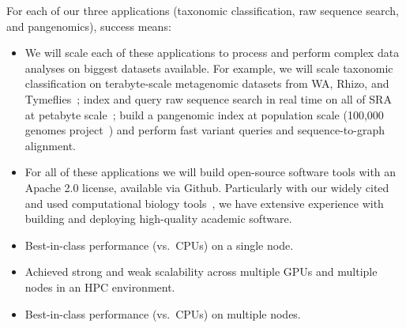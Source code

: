 For each of our three applications (taxonomic classification, raw sequence search, and pangenomics), success means:

\begin{itemize}[noitemsep]
  \item We will scale each of these applications to process and perform complex data analyses on biggest datasets available. For example, we will scale taxonomic classification on terabyte-scale metagenomic datasets from WA, Rhizo, and Tymeflies~\cite{hofmeyr2020terabase}; index and query raw sequence search in real time on all of SRA at petabyte scale~\cite{kodama2012sequence}; build a pangenomic index at population scale (100,000 genomes project~\cite{1002021100}) and perform fast variant queries and sequence-to-graph alignment.
  \item For all of these applications we will build open-source software tools with an Apache 2.0 license, available via Github. Particularly with our widely cited and used computational biology tools~\cite{PandeyABFJP18Cell,PandeyBJP17a,PandeyBJP17b,PandeyBJP17,pandey2020timely,pandey2021variantstore,pandey2021terrace,pandey2022iceberght}, we have extensive experience with building and deploying high-quality academic software.
  \item Best-in-class performance (vs.\ CPUs) on a single node.
  \item Achieved strong and weak scalability across multiple GPUs and multiple nodes in an HPC environment.
  \item Best-in-class performance (vs.\ CPUs) on multiple nodes.
\end{itemize}
